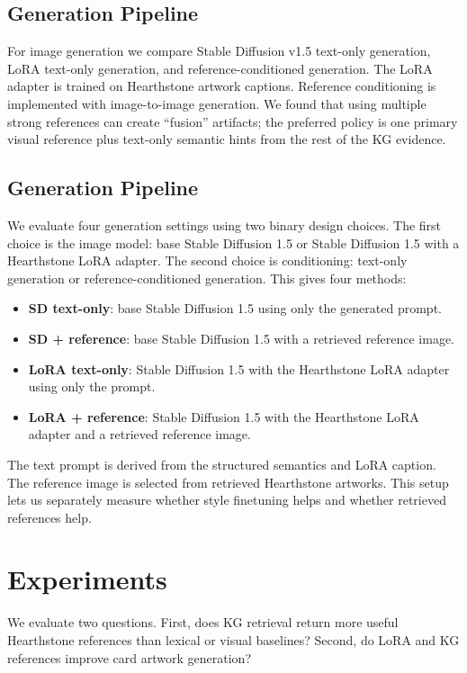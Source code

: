 \documentclass[10pt,twocolumn,letterpaper]{article}
\begin{document}
\subsection{Generation Pipeline}

For image generation we compare Stable Diffusion v1.5 text-only generation, LoRA text-only generation, and reference-conditioned generation. The LoRA adapter is trained on Hearthstone artwork captions. Reference conditioning is implemented with image-to-image generation. We found that using multiple strong references can create ``fusion'' artifacts; the preferred policy is one primary visual reference plus text-only semantic hints from the rest of the KG evidence.


\subsection{Generation Pipeline}

We evaluate four generation settings using two binary design choices. The first choice is the image model: base Stable Diffusion 1.5 or Stable Diffusion 1.5 with a Hearthstone LoRA adapter. The second choice is
conditioning: text-only generation or reference-conditioned generation. This gives four methods:
\begin{itemize}
\item \textbf{SD text-only}: base Stable Diffusion 1.5 using only the generated prompt.
\item \textbf{SD + reference}: base Stable Diffusion 1.5 with a retrieved reference image.
\item \textbf{LoRA text-only}: Stable Diffusion 1.5 with the Hearthstone LoRA adapter using only the prompt.
\item \textbf{LoRA + reference}: Stable Diffusion 1.5 with the Hearthstone LoRA adapter and a retrieved reference image.
\end{itemize}

The text prompt is derived from the structured semantics and LoRA caption. The reference image is selected from retrieved Hearthstone artworks. This setup lets us separately measure whether style finetuning helps and
whether retrieved references help.

\section{Experiments}

We evaluate two questions. First, does KG retrieval return more useful Hearthstone references than lexical or visual baselines? Second, do LoRA and KG references improve card artwork generation?
\end{document}
